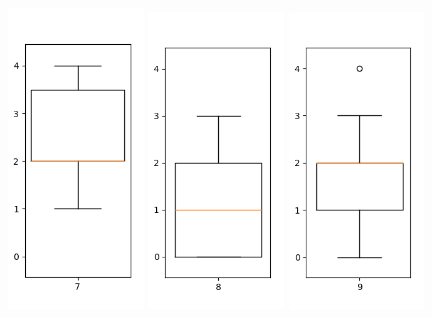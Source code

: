 \begin{figure}[h]
\includegraphics[width=0.32\textwidth]{7.png}
\includegraphics[width=0.32\textwidth]{8.png}
\includegraphics[width=0.32\textwidth]{9.png}

\end{figure}
